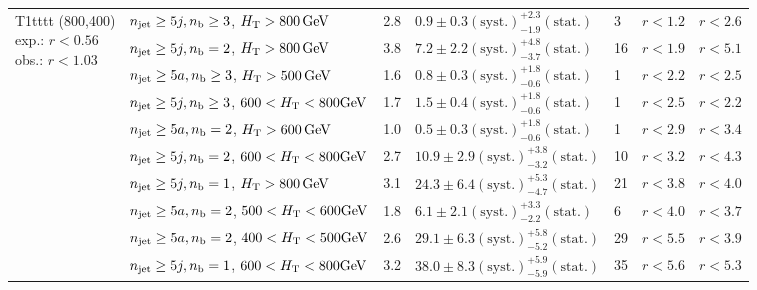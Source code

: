 \begin{table}[h!]
\begin{tabular}{ lllllll }
\multirow{10}{*}{\parbox[t]{2cm}{T1tttt (800,400)\\exp.: $r<0.56$\\obs.: $r<1.03$}}
 & $n_{\mathrm{jet}} \geq5j,n_{\text{b}} \geq3$, $\mbox{$H_\text{T}$} > 800 \, \mathrm{GeV}$ & 2.8 & $0.9 \pm 0.3 \mathrm{(syst.)} ^{+2.3}_{-1.9} \mathrm{(stat.)}$ & 3 & $r < 1.2$ & $r < 2.6$\\ 
 & $n_{\mathrm{jet}} \geq5j,n_{\text{b}} =2$, $\mbox{$H_\text{T}$} > 800 \, \mathrm{GeV}$ & 3.8 & $7.2 \pm 2.2 \mathrm{(syst.)} ^{+4.8}_{-3.7} \mathrm{(stat.)}$ & 16 & $r < 1.9$ & $r < 5.1$\\ 
 & $n_{\mathrm{jet}} \geq5a,n_{\text{b}} \geq3$, $\mbox{$H_\text{T}$} > 500 \, \mathrm{GeV}$ & 1.6 & $0.8 \pm 0.3 \mathrm{(syst.)} ^{+1.8}_{-0.6} \mathrm{(stat.)}$ & 1 & $r < 2.2$ & $r < 2.5$\\ 
 & $n_{\mathrm{jet}} \geq5j,n_{\text{b}} \geq3$, $600 < \mbox{$H_\text{T}$} < 800 \mathrm{GeV}$ & 1.7 & $1.5 \pm 0.4 \mathrm{(syst.)} ^{+1.8}_{-0.6} \mathrm{(stat.)}$ & 1 & $r < 2.5$ & $r < 2.2$\\ 
 & $n_{\mathrm{jet}} \geq5a,n_{\text{b}} =2$, $\mbox{$H_\text{T}$} > 600 \, \mathrm{GeV}$ & 1.0 & $0.5 \pm 0.3 \mathrm{(syst.)} ^{+1.8}_{-0.6} \mathrm{(stat.)}$ & 1 & $r < 2.9$ & $r < 3.4$\\ 
 & $n_{\mathrm{jet}} \geq5j,n_{\text{b}} =2$, $600 < \mbox{$H_\text{T}$} < 800 \mathrm{GeV}$ & 2.7 & $10.9 \pm 2.9 \mathrm{(syst.)} ^{+3.8}_{-3.2} \mathrm{(stat.)}$ & 10 & $r < 3.2$ & $r < 4.3$\\ 
 & $n_{\mathrm{jet}} \geq5j,n_{\text{b}} =1$, $\mbox{$H_\text{T}$} > 800 \, \mathrm{GeV}$ & 3.1 & $24.3 \pm 6.4 \mathrm{(syst.)} ^{+5.3}_{-4.7} \mathrm{(stat.)}$ & 21 & $r < 3.8$ & $r < 4.0$\\ 
 & $n_{\mathrm{jet}} \geq5a,n_{\text{b}} =2$, $500 < \mbox{$H_\text{T}$} < 600 \mathrm{GeV}$ & 1.8 & $6.1 \pm 2.1 \mathrm{(syst.)} ^{+3.3}_{-2.2} \mathrm{(stat.)}$ & 6 & $r < 4.0$ & $r < 3.7$\\ 
 & $n_{\mathrm{jet}} \geq5a,n_{\text{b}} =2$, $400 < \mbox{$H_\text{T}$} < 500 \mathrm{GeV}$ & 2.6 & $29.1 \pm 6.3 \mathrm{(syst.)} ^{+5.8}_{-5.2} \mathrm{(stat.)}$ & 29 & $r < 5.5$ & $r < 3.9$\\ 
 & $n_{\mathrm{jet}} \geq5j,n_{\text{b}} =1$, $600 < \mbox{$H_\text{T}$} < 800 \mathrm{GeV}$ & 3.2 & $38.0 \pm 8.3 \mathrm{(syst.)} ^{+5.9}_{-5.9} \mathrm{(stat.)}$ & 35 & $r < 5.6$ & $r < 5.3$\\ \hline
    \hline
  \end{tabular}
\end{table}

